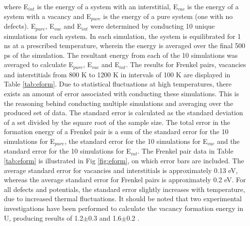\documentclass[review]{elsarticle}
\begin{document}
where E$_{int}$ is the energy of a system with an interstitial, E$_{vac}$ is the energy of a system with a vacancy and E$_{pure}$ is the energy of a pure system (one with no defects). E$_{pure}$, E$_{vac}$ and E$_{int}$ were determined by conducting 10 unique simulations for each system. In each simulation, the system is equilibrated for 1 ns at a prescribed temperature, wherein the energy is averaged over the final 500 ps of the simulation. The resultant energy from each of the 10 simulations was averaged to calculate E$_{pure}$, E$_{vac}$ and E$_{int}$. The results for Frenkel pairs, vacancies and interstitials from 800 K to 1200 K in intervals of 100 K are displayed in Table \ref{tab:eform}. Due to statistical fluctuations at high temperatures, there exists an amount of error associated with conducting these simulations. This is the reasoning behind conducting multiple simulations and averaging over the produced set of data. The standard error is calculated as the standard deviation of a set divided by the square root of the sample size. The total error in the formation energy of a Frenkel pair is a sum of the standard error for the 10 simulations for E$_{pure}$, the standard error for the 10 simulations for E$_{vac}$ and the standard error for the 10 simulations for E$_{int}$. The Frenkel pair data in Table \ref{tab:eform} is illustrated in Fig \ref{fig:eform}, on which error bars are included. The average standard error for vacancies and interstitials is approximately 0.13 eV, whereas the average standard error for Frenkel pairs is approximately 0.2 eV. For all defects and potentials, the standard error slightly increases with temperature, due to increased thermal fluctuations. It should be noted that two experimental investigations have been performed to calculate the vacancy formation energy in U, producing results of 1.2$\pm$0.3 \cite{matter1980} and 1.6$\pm$0.2 \cite{lund2013}.
\end{document}
